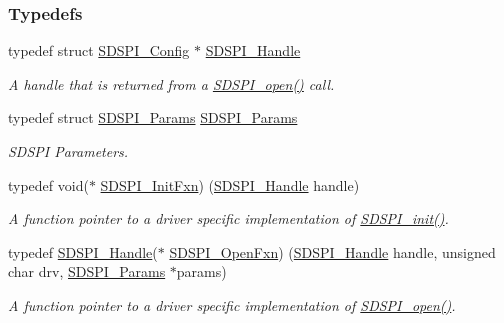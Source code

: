 \subsubsection*{Typedefs}
\begin{DoxyCompactItemize}
\item 
typedef struct \hyperlink{struct_s_d_s_p_i___config}{S\+D\+S\+P\+I\+\_\+\+Config} $\ast$ \hyperlink{_s_d_s_p_i_8h_abd3d22133d60c2e5afd49722d6bafb7e}{S\+D\+S\+P\+I\+\_\+\+Handle}
\begin{DoxyCompactList}\small\item\em A handle that is returned from a \hyperlink{_s_d_s_p_i_8h_af4a5ca9bb35e8a7df02acf20ceeae66d}{S\+D\+S\+P\+I\+\_\+open()} call. \end{DoxyCompactList}\item 
typedef struct \hyperlink{struct_s_d_s_p_i___params}{S\+D\+S\+P\+I\+\_\+\+Params} \hyperlink{_s_d_s_p_i_8h_a3fd9e0fa28415b0c0cf6ab03c37ca4d1}{S\+D\+S\+P\+I\+\_\+\+Params}
\begin{DoxyCompactList}\small\item\em S\+D\+S\+P\+I Parameters. \end{DoxyCompactList}\item 
typedef void($\ast$ \hyperlink{_s_d_s_p_i_8h_af13f4dd690895ef9905b94eb35186f39}{S\+D\+S\+P\+I\+\_\+\+Init\+Fxn}) (\hyperlink{_s_d_s_p_i_8h_abd3d22133d60c2e5afd49722d6bafb7e}{S\+D\+S\+P\+I\+\_\+\+Handle} handle)
\begin{DoxyCompactList}\small\item\em A function pointer to a driver specific implementation of \hyperlink{_s_d_s_p_i_8h_a83cfcebe7875d9d8b5e08e57e6785ae6}{S\+D\+S\+P\+I\+\_\+init()}. \end{DoxyCompactList}\item 
typedef \hyperlink{_s_d_s_p_i_8h_abd3d22133d60c2e5afd49722d6bafb7e}{S\+D\+S\+P\+I\+\_\+\+Handle}($\ast$ \hyperlink{_s_d_s_p_i_8h_ad5e9c96037fb86b0337f0183dec6457d}{S\+D\+S\+P\+I\+\_\+\+Open\+Fxn}) (\hyperlink{_s_d_s_p_i_8h_abd3d22133d60c2e5afd49722d6bafb7e}{S\+D\+S\+P\+I\+\_\+\+Handle} handle, unsigned char drv, \hyperlink{struct_s_d_s_p_i___params}{S\+D\+S\+P\+I\+\_\+\+Params} $\ast$params)
\begin{DoxyCompactList}\small\item\em A function pointer to a driver specific implementation of \hyperlink{_s_d_s_p_i_8h_af4a5ca9bb35e8a7df02acf20ceeae66d}{S\+D\+S\+P\+I\+\_\+open()}. \end{DoxyCompactList}\item 

\end{DoxyCompactItemize}
